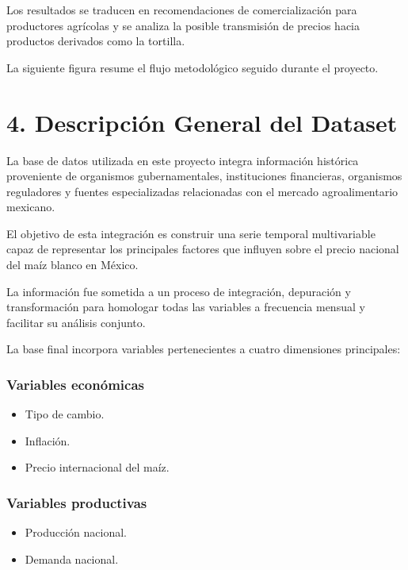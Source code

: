 \documentclass[11pt]{article}
\providecommand{\tightlist}{%
      \setlength{\itemsep}{0pt}\setlength{\parskip}{0pt}}
\begin{document}
Los resultados se traducen en recomendaciones de comercialización para
productores agrícolas y se analiza la posible transmisión de precios
hacia productos derivados como la tortilla.

La siguiente figura resume el flujo metodológico seguido durante el
proyecto.

    \hypertarget{descripciuxf3n-general-del-dataset}{%
\section{4. Descripción General del
Dataset}\label{descripciuxf3n-general-del-dataset}}

La base de datos utilizada en este proyecto integra información
histórica proveniente de organismos gubernamentales, instituciones
financieras, organismos reguladores y fuentes especializadas
relacionadas con el mercado agroalimentario mexicano.

El objetivo de esta integración es construir una serie temporal
multivariable capaz de representar los principales factores que influyen
sobre el precio nacional del maíz blanco en México.

La información fue sometida a un proceso de integración, depuración y
transformación para homologar todas las variables a frecuencia mensual y
facilitar su análisis conjunto.

La base final incorpora variables pertenecientes a cuatro dimensiones
principales:

\hypertarget{variables-econuxf3micas}{%
\subsubsection{Variables económicas}\label{variables-econuxf3micas}}

\begin{itemize}
\tightlist
\item
  Tipo de cambio.
\item
  Inflación.
\item
  Precio internacional del maíz.
\end{itemize}

\hypertarget{variables-productivas}{%
\subsubsection{Variables productivas}\label{variables-productivas}}

\begin{itemize}
\tightlist
\item
  Producción nacional.
\item
  Demanda nacional.
\end{itemize}
\end{document}
